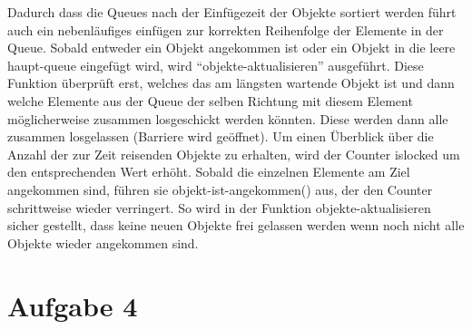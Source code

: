 \documentclass[11pt,a4paper,DIV=10,]{scrartcl}
\begin{document}
Dadurch dass die Queues nach der Einfügezeit der Objekte sortiert werden führt auch ein nebenläufiges einfügen zur korrekten Reihenfolge der Elemente in der Queue. Sobald entweder ein Objekt angekommen ist oder ein Objekt in die leere haupt-queue eingefügt wird, wird ``objekte-aktualisieren'' ausgeführt.
Diese Funktion überprüft erst, welches das am längsten wartende Objekt ist und dann welche Elemente aus der Queue der selben Richtung mit diesem Element möglicherweise zusammen losgeschickt werden könnten. Diese werden dann alle zusammen losgelassen (Barriere wird geöffnet). Um einen Überblick über die 
Anzahl der zur Zeit reisenden Objekte zu erhalten, wird der Counter islocked um den entsprechenden Wert erhöht. Sobald die einzelnen Elemente am Ziel angekommen sind, führen sie objekt-ist-angekommen() aus, der den Counter schrittweise wieder verringert. So wird in der Funktion objekte-aktualisieren sicher gestellt, dass keine neuen Objekte frei gelassen werden wenn noch nicht alle Objekte wieder angekommen sind. 

\section*{Aufgabe 4}
\end{document}
